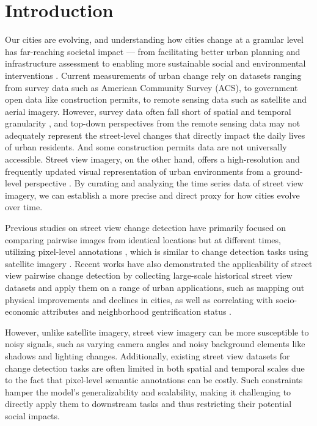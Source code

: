 \documentclass[letterpaper]{article} %
\begin{document}
\section{Introduction}
Our cities are evolving, and understanding how cities change at a granular level has far-reaching societal impact --- from facilitating better urban planning and infrastructure assessment to enabling more sustainable social and environmental interventions \cite{Daniel2015Goal1M,Seto2017SustainabilityIA}. 
Current measurements of urban change rely on datasets ranging from survey data such as American Community Survey (ACS), to government open data like construction permits, to remote sensing data such as satellite and aerial imagery. However, survey data often fall short of spatial and temporal granularity \cite{hwang14}, and top-down perspectives from the remote sensing data may not adequately represent the street-level changes that directly impact the daily lives of urban residents. And some construction permits data are not universally accessible.
Street view imagery, on the other hand, offers a high-resolution and frequently updated visual representation of urban environments from a ground-level perspective \cite{Huang2022DetectingNG}. By curating and analyzing the time series data of street view imagery, we can establish a more precise and direct proxy for how cities evolve over time.

Previous studies on street view change detection have primarily focused on comparing pairwise images from identical locations but at different times, utilizing pixel-level annotations \cite{Sakurada2015ChangeDF,sakurada2020weakly}, which is similar to change detection tasks using satellite imagery \cite{Leenstra2021SelfsupervisedPE,Shi2021ADS}. Recent works have also demonstrated the applicability of street view pairwise change detection by collecting large-scale historical street view datasets and apply them on a range of urban applications, such as mapping out physical improvements and declines in cities, as well as correlating with socio-economic attributes and neighborhood gentrification status \cite{Naik7571, Huang2022DetectingNG}. 

However, unlike satellite imagery, street view imagery can be more susceptible to noisy signals, such as varying camera angles and noisy background elements like shadows and lighting changes. Additionally, existing street view datasets for change detection tasks are often limited in both spatial and temporal scales due to the fact that pixel-level semantic annotations can be costly. Such constraints hamper the model's generalizability and scalability, making it challenging to directly apply them to downstream tasks and thus restricting their potential social impacts. 
\end{document}
